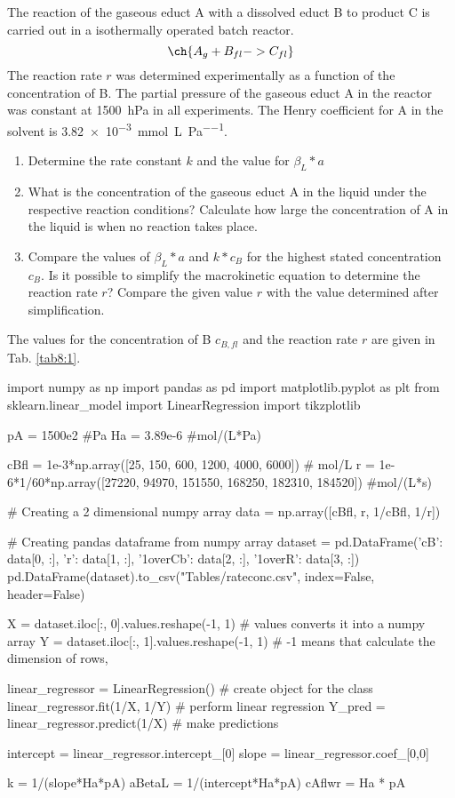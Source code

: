 \begin{question}
 The reaction of the gaseous educt A with a dissolved educt B to product C is carried out in a isothermally operated batch reactor.
 \begin{equation*}
  \ch{A_g + B_{fl} -> C_{fl}}
 \end{equation*}
 The reaction rate $r$ was determined experimentally as a function of the concentration of B. The partial pressure of the gaseous educt A in the reactor was constant at \SI{1500}{\hecto\pascal} in all experiments. The Henry coefficient for A in the solvent is \SI{3.82e-3}{\milli\mole\per\liter\per\pascal}.
\renewcommand{\labelenumi}{\alph{enumi})}
\begin{enumerate}
\item Determine the rate constant $k$ and the value for $\beta_L * a$
\item What is the concentration of the gaseous educt A in the liquid under the respective reaction conditions? Calculate how large the concentration of A in the liquid is when no reaction takes place.
\item Compare the values of $\beta_L * a$ and $k * c_B$ for the highest stated concentration $c_B$. Is it possible to simplify the macrokinetic equation to determine the reaction rate $r$? Compare the given value $r$ with the value determined after simplification. 
\end{enumerate}
The values for the concentration of B $c_{B,fl}$ and the reaction rate $r$ are given in Tab. \ref{tab8:1}.
\end{question}

\begin{pycode}
import numpy as np
import pandas as pd
import matplotlib.pyplot as plt
from sklearn.linear_model import LinearRegression
import tikzplotlib

pA = 1500e2 #Pa
Ha = 3.89e-6 #mol/(L*Pa)

cBfl = 1e-3*np.array([25, 150, 600, 1200, 4000, 6000]) # mol/L
r = 1e-6*1/60*np.array([27220, 94970, 151550, 168250, 182310, 184520]) #mol/(L*s)

# Creating a 2 dimensional numpy array
data = np.array([cBfl, r, 1/cBfl, 1/r])

# Creating pandas dataframe from numpy array
dataset = pd.DataFrame({'cB': data[0, :], 'r': data[1, :], '1overCb': data[2, :], '1overR': data[3, :]})
pd.DataFrame(dataset).to_csv("Tables/rateconc.csv", index=False, header=False)

X = dataset.iloc[:, 0].values.reshape(-1, 1)  # values converts it into a numpy array
Y = dataset.iloc[:, 1].values.reshape(-1, 1)  # -1 means that calculate the dimension of rows,

linear_regressor = LinearRegression()  # create object for the class
linear_regressor.fit(1/X, 1/Y)         # perform linear regression
Y_pred = linear_regressor.predict(1/X) # make predictions

intercept = linear_regressor.intercept_[0]
slope = linear_regressor.coef_[0,0]

k = 1/(slope*Ha*pA)
aBetaL = 1/(intercept*Ha*pA)
cAflwr = Ha * pA
\end{pycode}

